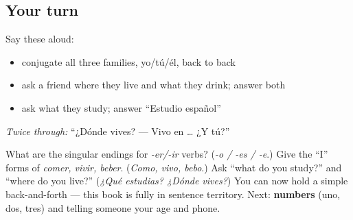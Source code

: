 \subsection*{Your turn}
Say these aloud:

\begin{itemize}
\raggedright
  \item conjugate all three families, yo/tú/él, back to back
  \item ask a friend where they live and what they drink; answer both
  \item ask what they study; answer \textquotedblleft{}Estudio español\textquotedblright{}
\end{itemize}

\emph{Twice through:} \textquotedblleft{}¿Dónde vives? — Vivo en … ¿Y tú?\textquotedblright{}

\begin{tcolorbox}[breakable,colback=teal!4,colframe=teal!35!black,title={Before you move on}]
What are the singular endings for \emph{-er/-ir} verbs? (\emph{-o / -es / -e}.) Give the \textquotedblleft{}I\textquotedblright{} forms of \emph{comer, vivir, beber}. (\emph{Como, vivo, bebo}.) Ask \textquotedblleft{}what do you study?\textquotedblright{} and \textquotedblleft{}where do you live?\textquotedblright{} (\emph{¿Qué estudias? ¿Dónde vives?}) You can now hold a simple back-and-forth — this book is fully in sentence territory. Next: \textbf{numbers} (uno, dos, tres) and telling someone your age and phone.
\end{tcolorbox}

